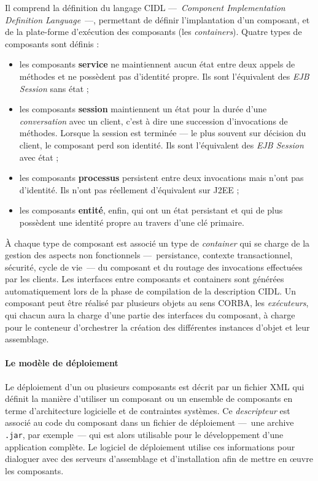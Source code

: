 Il comprend la d\'efinition du langage \textsf{CIDL} ---~\emph{Component Implementation
Definition Language}~---, permettant de d\'efinir
l'implantation d'un composant, et de la plate-forme d'ex\'ecution des
composants (les \emph{containers}). Quatre types de composants sont
d\'efinis : 
\begin{itemize}
\item les composants \textbf{service} ne maintiennent aucun \'etat entre 
  deux appels de m\'ethodes et ne poss\`edent pas d'identit\'e
  propre. Ils sont l'\'equivalent des \emph{EJB Session} sans \'etat ;
\item les composants  \textbf{session} maintiennent un \'etat pour la
  dur\'ee d'une \emph{conversation} avec un client, c'est \`a dire une
  succession d'invocations de m\'ethodes. Lorsque la session est
  termin\'ee --- le plus souvent sur d\'ecision du client, le composant
  perd son identit\'e. Ils sont l'\'equivalent des \emph{EJB Session} avec
  \'etat ;
\item les composants \textbf{processus} persistent entre deux
  invocations mais n'ont pas d'identit\'e. Ils n'ont pas
  r\'eellement d'\'equivalent sur \textsf{J2EE} ;
\item les composants \textbf{entit\'e}, enfin, qui ont un \'etat
  persistant et qui de plus poss\`edent une identit\'e propre au travers
  d'une cl\'e primaire. 
\end{itemize}

\`A chaque type de composant est associ\'e un type de \emph{container} qui 
se charge de la gestion des aspects non fonctionnels ---~persistance,
contexte transactionnel, s\'ecurit\'e, cycle de
vie~--- du composant et du routage des invocations effectu\'ees par les
clients. Les interfaces entre composants et containers sont g\'en\'er\'ees
automatiquement lors de la phase de compilation de la description \textsf{CIDL}. 
Un composant peut \^etre r\'ealis\'e par plusieurs objets au sens
\textsf{CORBA}, les \emph{ex\'ecuteurs}, qui chacun aura la charge d'une partie des
interfaces du composant, \`a charge pour le conteneur d'orchestrer la
cr\'eation des diff\'erentes instances d'objet et leur assemblage.

\paragraph{Le mod\`ele de d\'eploiement}

Le d\'eploiement d'un ou plusieurs composants est d\'ecrit par un
fichier \textsf{XML} qui d\'efinit la mani\`ere d'utiliser un composant 
ou un ensemble de composants en terme d'architecture logicielle et 
de contraintes syst\`emes. Ce \emph{descripteur} est  associ\'e au code du composant  dans un
fichier de d\'eploiement ---~une archive \texttt{.jar}, par exemple~--- qui 
est alors utilisable pour le d\'eveloppement d'une application
compl\`ete. 
Le logiciel de
d\'eploiement utilise ces informations pour dialoguer avec des
serveurs d'assemblage et d'installation afin de mettre en \oe uvre
les composants.

